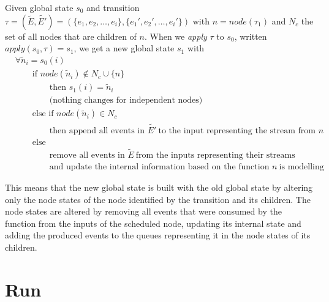 \begin{definition}[name = Application of a Transition on a State]\label{def:application_transition}
  Given global state \(s_0\) and transition \(\tau = (\widetilde{E}, \widetilde{E'}) = (\{e_1,e_2,\dots,e_i\}, \{e_1',e_2',\dots,e_i'\})\) with \(n = \mathit{node}(\tau_1)\) and \(N_c\) the set of all nodes that are children of \(n\).
  When we \emph{apply} \(\tau\) to \(s_0\), written \(\mathit{apply}(s_0, \tau) = s_1\), we get a new global state \(s_1\) with
  \begin{align*}
    &\forall \widetilde{n}_i = s_0(i)\\
    &\hspace{2em} \text{if } \mathit{node}(\widetilde{n}_i) \not\in N_c \cup \{n\}\\
    &\hspace{4em} \text{then } s_1(i) = \widetilde{n}_i\\
    &\hspace{4em} \text{(nothing changes for independent nodes)} \\
    &\hspace{2em} \text{else if } \mathit{node}(\widetilde{n}_i) \in N_c\\
    &\hspace{4em} \text{then append all events in } \widetilde{E'}\ \text{to the input representing the stream from } n \\
    &\hspace{2em} \text{else}\\
    &\hspace{4em} \text{remove all events in } \widetilde{E}\ \text{from the inputs representing their streams}\\
    &\hspace{4em} \text{and update the internal information based on the function } n\ \text{is modelling}
  \end{align*}
\end{definition}

This means that the new global state is built with the old global state by altering only the node states of the node identified by the transition and its children.
The node states are altered by removing all events that were consumed by the function from the inputs of the scheduled node, updating its internal state and adding the produced events to the queues representing it in the node states of its children.

\section{Run}
\label{sec:definitions:run}

